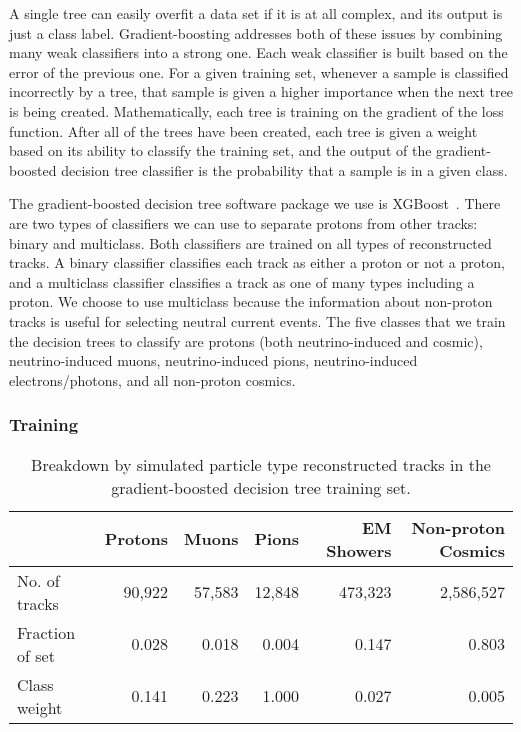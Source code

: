     A single tree can easily overfit a data set if it is at all complex, and
    its output is just a class label. Gradient-boosting addresses both of these
    issues by combining many weak classifiers into a strong one. Each weak
    classifier is built based on the error of the previous one. For a given
    training set, whenever a sample is classified incorrectly by a tree, that
    sample is given a higher importance when the next tree is being created.
    Mathematically, each tree is training on the gradient of the loss function.
    After all of the trees have been created, each tree is given a weight based
    on its ability to classify the training set, and the output of the
    gradient-boosted decision tree classifier is the probability that a sample
    is in a given class.
    
    The gradient-boosted decision tree software package we use is
    XGBoost~\cite{Chen:2016btl}. There are two types of classifiers we can use
    to separate protons from other tracks: binary and multiclass. Both
    classifiers are trained on all types of reconstructed tracks. A binary
    classifier classifies each track as either a proton or not a proton, and a
    multiclass classifier classifies a track as one of many types including a
    proton. We choose to use multiclass because the information about
    non-proton tracks is useful for selecting neutral current events. The five
    classes that we train the decision trees to classify are protons (both
    neutrino-induced and cosmic), neutrino-induced muons, neutrino-induced
    pions, neutrino-induced electrons/photons, and all non-proton cosmics.
    
  \subsubsection{Training}
    \begin{table}[ht]
      \caption{Breakdown by simulated particle type reconstructed tracks in the
        gradient-boosted decision tree training set.
      \label{tab:mctrain}}
      \begin{tabularx}{\textwidth}{ l r r r r r }
        \hline
        & Protons & Muons & Pions & EM Showers & Non-proton Cosmics \\
        \hline
        No. of tracks  & 90,922 & 57,583 & 12,848 & 473,323 & 2,586,527 \\
        Fraction of set & 0.028 & 0.018 & 0.004 & 0.147 & 0.803 \\
        Class weight  & 0.141 & 0.223 & 1.000 & 0.027 & 0.005 \\
        \hline
      \end{tabularx}
    \end{table}

